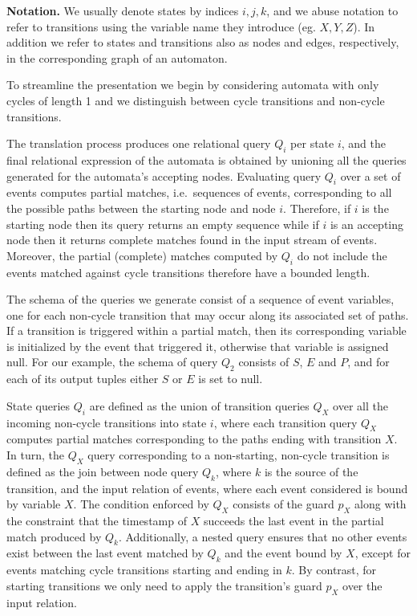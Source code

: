 {\bf Notation.}
We usually denote states by indices $i, j, k$, and we abuse notation to refer 
to transitions using the variable name they introduce (eg. $X, Y, Z$).
In addition we refer to states and transitions also as nodes and edges, 
respectively, in the corresponding graph of an automaton.

To streamline the presentation we begin by considering automata with only
cycles of length 1 and we distinguish between cycle transitions and
non-cycle transitions.


The translation process produces one relational query $Q_i$ per state $i$, and 
the final relational expression of the automata is obtained by unioning all the 
queries generated for the automata's accepting nodes.
Evaluating query $Q_i$ over a set of events computes partial matches, i.e.\ 
sequences of events, corresponding to all the possible paths between the 
starting node and node $i$.
Therefore, if $i$ is the starting node then its query returns an empty sequence 
while if $i$ is an accepting node then it returns complete matches found in the 
input stream of events.
Moreover, the partial (complete) matches computed by $Q_i$ do not include the 
events matched against cycle transitions therefore have a bounded length. 

The schema of the queries we generate consist of a sequence of event variables, 
one for each non-cycle transition that may occur along its associated set of 
paths. 
If a transition is triggered within a partial match, then its corresponding 
variable is initialized by the event that triggered it, otherwise that variable 
is assigned null.
For our example, the schema of query $Q_2$ consists of $S$, $E$ and $P$, and 
for each of its output tuples either $S$ or $E$ is set to null.


State queries $Q_i$ are defined as the union of transition queries $Q_X$ over 
all the incoming non-cycle transitions into state $i$, where each transition 
query $Q_X$ computes partial matches corresponding to the paths ending with 
transition $X$.
In turn, the $Q_X$ query corresponding to a non-starting, non-cycle transition 
is defined as the join between node query $Q_k$, where $k$ is the source of the 
transition, and the input relation of events, where each event considered is 
bound by variable $X$.
The condition enforced by $Q_X$ consists of the guard $p_X$ along with the 
constraint that the timestamp of $X$ succeeds the last event in the partial 
match produced by $Q_k$.
Additionally, a nested query ensures that no other events 
exist between the last event matched by $Q_k$ and the event bound by $X$, 
except for events matching cycle transitions starting and ending in $k$.
By contrast, for starting transitions we only need to apply the transition's 
guard $p_X$ over the input relation.

